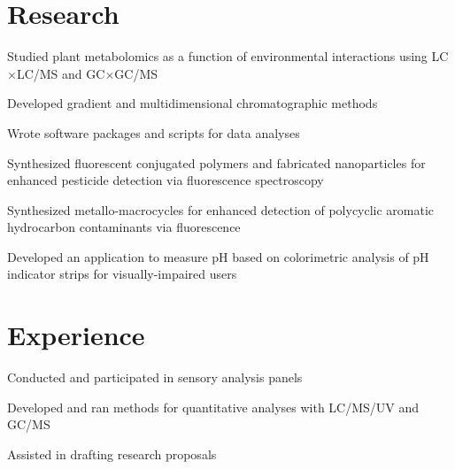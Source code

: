 \documentclass[]{deedy-resume-openfont}
\begin{document}
\begin{minipage}[t]{0.7\textwidth}

\section{Research}
\vspace{\topsep}
\begin{tightemize}
\item Studied plant metabolomics as a function of environmental interactions
    using LC$\times$LC/MS and GC$\times$GC/MS
\item Developed gradient and multidimensional chromatographic methods
\item Wrote software packages and scripts for data analyses
\end{tightemize}
\sectionsep

\begin{tightemize}
\item Synthesized fluorescent conjugated polymers and fabricated nanoparticles
for enhanced pesticide detection via fluorescence spectroscopy
\item Synthesized metallo-macrocycles for enhanced
detection of polycyclic aromatic hydrocarbon contaminants via fluorescence
\end{tightemize}
\sectionsep

\begin{tightemize}
\item Developed an application to measure pH based on colorimetric analysis of
pH indicator strips for visually-impaired users
\end{tightemize}

\section{Experience}

\begin{tightemize}
\item Conducted and participated in sensory analysis panels
\item Developed and ran methods for quantitative analyses with LC/MS/UV
    and GC/MS
\item Assisted in drafting research proposals
\end{tightemize}
\sectionsep


\end{minipage}
\end{document}
